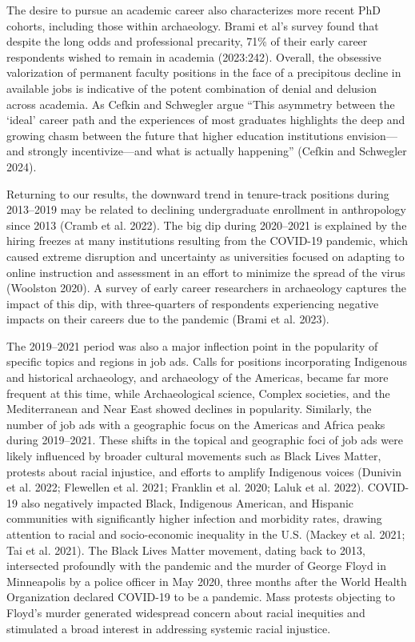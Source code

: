 \documentclass[
  12pt,
]{article}
\begin{document}
The desire to pursue an academic career also characterizes more recent
PhD cohorts, including those within archaeology. Brami et al's survey
found that despite the long odds and professional precarity, 71\% of
their early career respondents wished to remain in academia (2023:242).
Overall, the obsessive valorization of permanent faculty positions in
the face of a precipitous decline in available jobs is indicative of the
potent combination of denial and delusion across academia. As Cefkin and
Schwegler argue ``This asymmetry between the `ideal' career path and the
experiences of most graduates highlights the deep and growing chasm
between the future that higher education institutions envision---and
strongly incentivize---and what is actually happening'' (Cefkin and
Schwegler 2024).

Returning to our results, the downward trend in tenure-track positions
during 2013--2019 may be related to declining undergraduate enrollment
in anthropology since 2013 (Cramb et al. 2022). The big dip during
2020--2021 is explained by the hiring freezes at many institutions
resulting from the COVID-19 pandemic, which caused extreme disruption
and uncertainty as universities focused on adapting to online
instruction and assessment in an effort to minimize the spread of the
virus (Woolston 2020). A survey of early career researchers in
archaeology captures the impact of this dip, with three-quarters of
respondents experiencing negative impacts on their careers due to the
pandemic (Brami et al. 2023).

The 2019--2021 period was also a major inflection point in the
popularity of specific topics and regions in job ads. Calls for
positions incorporating Indigenous and historical archaeology, and
archaeology of the Americas, became far more frequent at this time,
while Archaeological science, Complex societies, and the Mediterranean
and Near East showed declines in popularity. Similarly, the number of
job ads with a geographic focus on the Americas and Africa peaks during
2019--2021. These shifts in the topical and geographic foci of job ads
were likely influenced by broader cultural movements such as Black Lives
Matter, protests about racial injustice, and efforts to amplify
Indigenous voices (Dunivin et al. 2022; Flewellen et al. 2021; Franklin
et al. 2020; Laluk et al. 2022). COVID-19 also negatively impacted
Black, Indigenous American, and Hispanic communities with significantly
higher infection and morbidity rates, drawing attention to racial and
socio-economic inequality in the U.S. (Mackey et al. 2021; Tai et al.
2021). The Black Lives Matter movement, dating back to 2013, intersected
profoundly with the pandemic and the murder of George Floyd in
Minneapolis by a police officer in May 2020, three months after the
World Health Organization declared COVID-19 to be a pandemic. Mass
protests objecting to Floyd's murder generated widespread concern about
racial inequities and stimulated a broad interest in addressing systemic
racial injustice.
\end{document}
